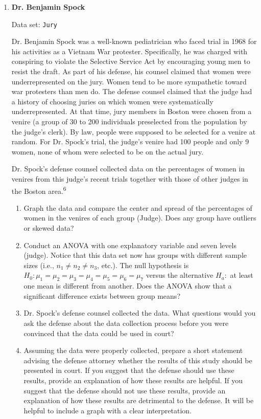 \documentclass[
]{book}
\begin{document}
\begin{enumerate}
  \item \textbf{Dr. Benjamin Spock}

Data set: \texttt{Jury}

Dr. Benjamin Spock was a well-known pediatrician who faced trial in 1968 for his activities as a Vietnam War protester. Specifically, he was charged with conspiring to violate the Selective Service Act by encouraging young men to resist the draft. As part of his defense, his counsel claimed that women were underrepresented on the jury. Women tend to be more sympathetic toward war protesters than men do. The defense counsel claimed that the judge had a history of choosing juries on which women were systematically underrepresented. At that time, jury members in Boston were chosen from a venire (a group of 30 to 200 individuals preselected from the population by the judge’s clerk). By law, people were supposed to be selected for a venire at random. For Dr. Spock’s trial, the judge’s venire had 100 people and only 9 women, none of whom were selected to be on the actual jury.

Dr. Spock’s defense counsel collected data on the percentages of women in venires from this judge’s recent trials together with those of other judges in the Boston area.\textsuperscript{6}

  \begin{enumerate}
    \item Graph the data and compare the center and spread of the percentages of women in the venires of each group (Judge). Does any group have outliers or skewed data?
      \item Conduct an ANOVA with one explanatory variable and seven levels (judge). Notice that this data set now has groups with different sample sizes (i.e., $n_1 \ne n_2 \ne n_3$, etc.). The null hypothesis is $H_0\colon \mu_1 = \mu_2 = \mu_3 = \mu_4 = \mu_5 = \mu_6 = \mu_7$ versus the alternative $H_a\colon$ at least one mean is different from another. Does the ANOVA show that a significant difference exists between group means?
      \item Dr. Spock’s defense counsel collected the data. What questions would you ask the defense about the data collection process before you were convinced that the data could be used in court?
      \item Assuming the data were properly collected, prepare a short statement advising the defense attorney whether the results of this study should be presented in court. If you suggest that the defense should use these results, provide an explanation of how these results are helpful. If you suggest that the defense should not use these results, provide an explanation of how these results are detrimental to the defense. It will be helpful to include a graph with a clear interpretation.
    \end{enumerate}


\end{enumerate}
\end{document}
